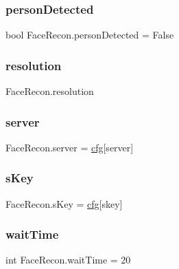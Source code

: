 \subsubsection{\texorpdfstring{person\+Detected}{personDetected}}
{\footnotesize\ttfamily bool Face\+Recon.\+person\+Detected = False}

\mbox{\label{namespace_face_recon_a6401bc73862ba52d12acc4e195359b84}} 
\subsubsection{\texorpdfstring{resolution}{resolution}}
{\footnotesize\ttfamily Face\+Recon.\+resolution}

\mbox{\label{namespace_face_recon_a78159752a247e46ae64caea5570a6889}} 
\subsubsection{\texorpdfstring{server}{server}}
{\footnotesize\ttfamily Face\+Recon.\+server = \mbox{\hyperlink{namespace_face_recon_a6a0cb127a374ad0eb5705d0f49a40040}{cfg}}\mbox{[}\textquotesingle{}server\textquotesingle{}\mbox{]}}

\mbox{\label{namespace_face_recon_a5c8b2fa43564cbbd3abf3d1cacef7e8c}} 
\subsubsection{\texorpdfstring{s\+Key}{sKey}}
{\footnotesize\ttfamily Face\+Recon.\+s\+Key = \mbox{\hyperlink{namespace_face_recon_a6a0cb127a374ad0eb5705d0f49a40040}{cfg}}\mbox{[}\textquotesingle{}skey\textquotesingle{}\mbox{]}}

\mbox{\label{namespace_face_recon_a1cec4fb530e8a7a1b10ac48890f36e7b}} 
\subsubsection{\texorpdfstring{wait\+Time}{waitTime}}
{\footnotesize\ttfamily int Face\+Recon.\+wait\+Time = 20}

